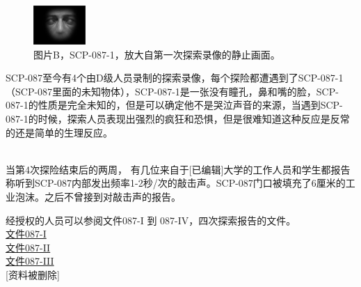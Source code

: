 \begin{figure}[H]
    \centering
    \includegraphics[width=0.5\linewidth]{images/SCP.087.2.png}
    \caption*{图片B，SCP-087-1，放大自第一次探索录像的静止画面。}
\end{figure}

SCP-087至今有4个由D级人员录制的探索录像，每个探险都遭遇到了SCP-087-1（SCP-087里面的未知物体），SCP-087-1是一张没有瞳孔，鼻和嘴的脸，SCP-087-1的性质是完全未知的，但是可以确定他不是哭泣声音的来源，当遇到SCP-087-1的时候，探索人员表现出强烈的疯狂和恐惧，但是很难知道这种反应是反常的还是简单的生理反应。

\\
当第4次探险结束后的两周， 有几位来自于{[}已编辑]大学的工作人员和学生都报告称听到SCP-087内部发出频率1-2秒\slash 次的敲击声。SCP-087门口被填充了6厘米的工业泡沫。之后不曾接到对敲击声的报告。

经授权的人员可以参阅文件087-I 到 087-IV，四次探索报告的文件。\\
\hyperref[chap:DOC-document-087-i]{文件087-I}\\
\hyperref[chap:DOC-document-087-ii]{文件087-II}\\
\hyperref[chap:DOC-document-087-iii]{文件087-III}\\
{[}资料被删除]
